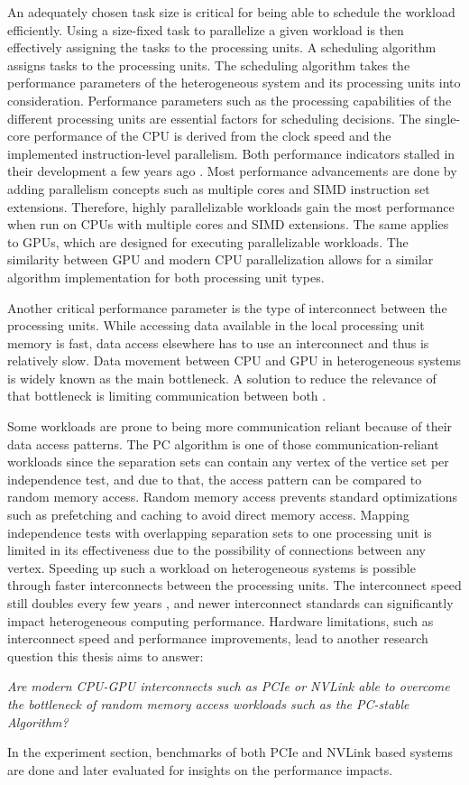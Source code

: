 An adequately chosen task size is critical for being able to schedule the workload efficiently. Using a size-fixed task to parallelize a given workload is then effectively assigning the tasks to the processing units. A scheduling algorithm assigns tasks to the processing units. The scheduling algorithm takes the performance parameters of the heterogeneous system and its processing units into consideration.
Performance parameters such as the processing capabilities of the different processing units are essential factors for scheduling decisions. The single-core performance of the CPU is derived from the clock speed and the implemented instruction-level parallelism. Both performance indicators stalled in their development a few years ago \cite{sutterFreeLunchFundamental2005}. Most performance advancements are done by adding parallelism concepts such as multiple cores and SIMD instruction set extensions. Therefore, highly parallelizable workloads gain the most performance when run on CPUs with multiple cores and SIMD extensions. The same applies to GPUs, which are designed for executing parallelizable workloads.
The similarity between GPU and modern CPU parallelization allows for a similar algorithm implementation for both processing unit types.

Another critical performance parameter is the type of interconnect between the processing units. While accessing data available in the local processing unit memory is fast,  data access elsewhere has to use an interconnect and thus is relatively slow. Data movement between CPU and GPU in heterogeneous systems is widely known as the main bottleneck. A solution to reduce the relevance of that bottleneck is limiting communication between both \cite{hazarikaSurveyMemoryManagement2019}.

Some workloads are prone to being more communication reliant because of their data access patterns. The PC algorithm is one of those communication-reliant workloads since the separation sets can contain any vertex of the vertice set per independence test, and due to that, the access pattern can be compared to random memory access. Random memory access prevents standard optimizations such as prefetching and caching to avoid direct memory access. Mapping independence tests with overlapping separation sets to one processing unit is limited in its effectiveness due to the possibility of connections between any vertex. Speeding up such a workload on heterogeneous systems is possible through faster interconnects between the processing units. The interconnect speed still doubles every few years \cite{NVLink2021}, and newer interconnect standards can significantly impact heterogeneous computing performance.
Hardware limitations, such as interconnect speed and performance improvements, lead to another research question this thesis aims to answer:

\textit{Are modern CPU-GPU interconnects such as PCIe or NVLink able to overcome the bottleneck of random memory access workloads such as the PC-stable Algorithm?}

In the experiment section, benchmarks of both PCIe and NVLink based systems are done and later evaluated for insights on the performance impacts.
